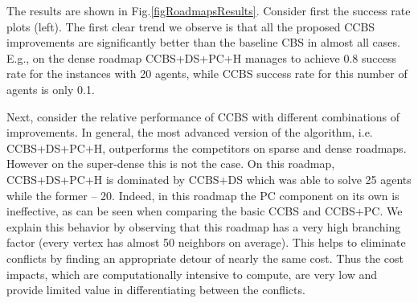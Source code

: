 \documentclass[letterpaper]{article} %
\newcommand\roni[1]{\nb{\textbf{Roni:}}{orange}{#1}}
\newcommand{\cbs}{\ac{CBS}\xspace}
\newcommand{\ccbs}{\ac{CCBS}\xspace}
\newcommand{\pc}{\ac{PC}\xspace}
\newcommand{\ds}{\ac{DS}\xspace}
\begin{document}
The results are shown in Fig.\ref{figRoadmapsResults}. Consider first the success rate plots (left). %
The first clear trend we observe is that all the proposed \ccbs improvements are significantly better than the baseline \cbs in almost all cases.
E.g., on the dense roadmap \ccbs+\ds+\pc+H manages to achieve 0.8 success rate for the instances with 20 agents, while \ccbs success rate for this number of agents is only 0.1.


Next, consider the relative performance of \ccbs with different combinations of improvements. In general, the most advanced version of the algorithm, i.e. \ccbs+\ds+\pc+H, outperforms the competitors on sparse and dense roadmaps.
However on the super-dense this is not the case. On this roadmap, \ccbs+\ds+\pc+H is dominated by \ccbs+\ds which was able to solve 25 agents while the former -- 20.
Indeed, in this roadmap the \pc component on its own is ineffective, as can be seen when comparing the basic \ccbs and \ccbs+\pc.
We explain this behavior by observing that this roadmap has a very high branching factor (every vertex has almost 50 neighbors on average).
This helps to eliminate conflicts by finding an appropriate detour of nearly the same cost. Thus the cost impacts, which are computationally intensive to compute, are very low and provide limited value in differentiating between the conflicts. %



\end{document}
